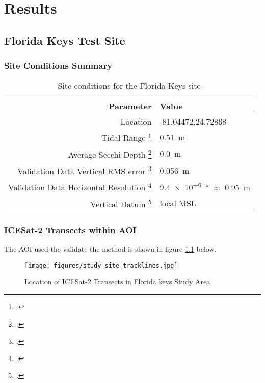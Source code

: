 \chapter{Results}

\section{Florida Keys Test Site}



\subsection{Site Conditions Summary}


\begin{table}[htbp]
    \begin{minipage}{0.5\textwidth}
        \centering\begin{tabular}{r l }
            Parameter                                                      & \textbf{Value}                                 \\
            \hline
            Location                                                       & -81.04472,24.72868                             \\
            Tidal Range \footcite{tidal_data_reanalysis2022}               & \qty{0.51}{m}                                  \\
            Average Secchi Depth \footcite{ACRI-STGlobColourTeam2020}      & \qty{0.0}{m}                                   \\
            Validation Data Vertical RMS error \footcite{Keys2019Lidar}    & \qty{0.056}{m}                                 \\
            Validation Data Horizontal Resolution \footcite{Keys2019Lidar} & \qty{9.4e-6}{ \degree} $\approx$ \qty{0.95}{m} \\
            Vertical Datum \footcite{Keys2019Lidar}                        & local MSL                                      \\
        \end{tabular}
    \end{minipage}
    \caption{Site conditions for the Florida Keys site}
    \label{table:floridasitestats}
\end{table}


\subsection{ICESat-2 Transects within AOI}
The AOI used the validate the method is shown in figure \ref{fig:keys_transects} below.
\begin{figure}[h!]
    \centering
    \texttt{[image: figures/study\_site\_tracklines.jpg]}
    \caption{Location of ICESat-2 Transects in Florida keys Study Area}
    \label{fig:keys_transects}
\end{figure}
